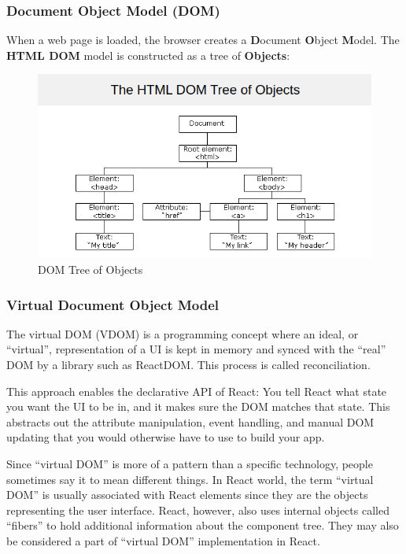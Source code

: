 \subsubsection{Document Object Model (DOM)}
\par{
	When a web page is loaded, the browser creates a \textbf{D}ocument \textbf{O}bject \textbf{M}odel.
	The \textbf{HTML DOM} model is constructed as a tree of \textbf{Objects}:

	\begin{figure}[!ht]
		\centering
		\includegraphics[scale=0.7]{Picture/mobile/dom_tree.png}
		\caption{DOM Tree of Objects}
		\label{fig:dom_tree}
	\end{figure}
}
\subsubsection{Virtual Document Object Model}
\par{
	The virtual DOM (VDOM) is a programming concept where an ideal, or “virtual”, representation of a UI is kept in memory and synced with the “real” DOM by a library such as ReactDOM. This process is called reconciliation.

	This approach enables the declarative API of React: You tell React what state you want the UI to be in, and it makes sure the DOM matches that state. This abstracts out the attribute manipulation, event handling, and manual DOM updating that you would otherwise have to use to build your app.

	Since “virtual DOM” is more of a pattern than a specific technology, people sometimes say it to mean different things. In React world, the term “virtual DOM” is usually associated with React elements since they are the objects representing the user interface. React, however, also uses internal objects called “fibers” to hold additional information about the component tree. They may also be considered a part of “virtual DOM” implementation in React.

}
